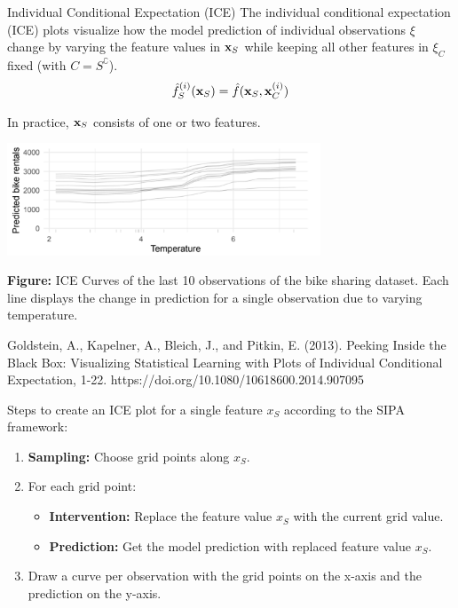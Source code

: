 










\begin{vbframe}{Individual Conditional Expectation (ICE)}
The individual conditional expectation (ICE) plots visualize how the model prediction of individual observations $\xi$
change by varying the feature values in $\xv_S$ while keeping all other features in $\xi_C$ fixed (with $C = S^\complement$).
$$\fh_{S}^{(i)}(\xv_S) = \fh(\xv_S, \xi_C)$$

In practice, $\xv_S$ consists of one or two features.

\vspace{-0.2cm}
\begin{center}
\includegraphics[width=0.7\textwidth]{figure_man/ICE01.png}
\end{center}

\vspace{-0.3cm}
{\scriptsize{\textbf{Figure:} ICE Curves of the last 10 observations of the bike sharing dataset. Each line displays the change in prediction for a single observation due to varying temperature.}\par}

\vspace{0.4cm}
\tiny{Goldstein, A., Kapelner, A., Bleich, J., and Pitkin, E. (2013). Peeking Inside the Black Box: Visualizing Statistical Learning with Plots of Individual Conditional Expectation, 1-22. https://doi.org/10.1080/10618600.2014.907095 \par}
\normalsize


\framebreak

Steps to create an ICE plot for a single feature $x_S$ according to the SIPA framework:

\begin{enumerate}
\item \textbf{Sampling:} Choose grid points along $x_S$.
\item For each grid point:
  \begin{itemize}
    \item \textbf{Intervention:} Replace the feature value $x_S$ with the current grid value.
    \item \textbf{Prediction:} Get the model prediction with replaced feature value $x_S$.
  \end{itemize}
\item Draw a curve per observation with the grid points on the x-axis and the prediction on the y-axis.
\end{enumerate}


\end{vbframe}
